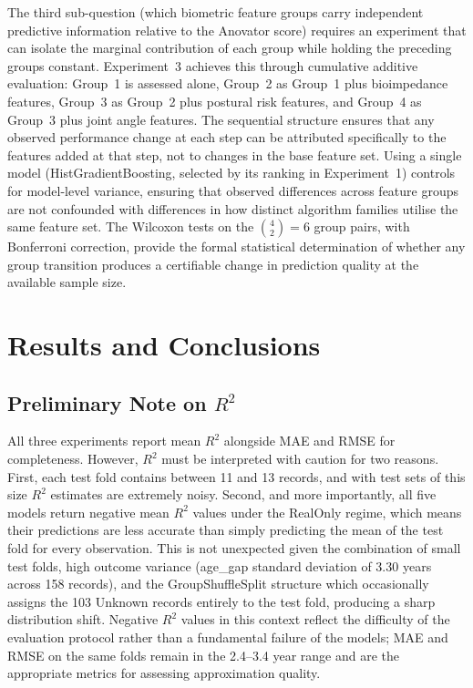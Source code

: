 \documentclass[11pt,a4paper]{report}
\begin{document}
The third sub-question (which biometric feature groups carry independent predictive information
relative to the Anovator score) requires an experiment that can isolate the marginal
contribution of each group while holding the preceding groups constant. Experiment~3 achieves this
through cumulative additive evaluation: Group~1 is assessed alone, Group~2 as Group~1 plus
bioimpedance features, Group~3 as Group~2 plus postural risk features, and Group~4 as Group~3
plus joint angle features. The sequential structure ensures that any observed performance change
at each step can be attributed specifically to the features added at that step, not to changes in
the base feature set. Using a single model (HistGradientBoosting, selected by its ranking in
Experiment~1) controls for model-level variance, ensuring that observed differences across
feature groups are not confounded with differences in how distinct algorithm families utilise the
same feature set. The Wilcoxon tests on the $\binom{4}{2} = 6$ group pairs, with Bonferroni correction,
provide the formal statistical determination of whether any group transition produces a certifiable
change in prediction quality at the available sample size.


\chapter{Results and Conclusions}

\section{Preliminary Note on \texorpdfstring{$R^2$}{R-squared}}

All three experiments report mean $R^2$ alongside MAE and RMSE for completeness. However, $R^2$ must be interpreted with caution for two reasons. First, each test fold contains between 11 and 13 records, and with test sets of this size $R^2$ estimates are extremely noisy. Second, and more importantly, all five models return negative mean $R^2$ values under the RealOnly regime, which means their predictions are less accurate than simply predicting the mean of the test fold for every observation. This is not unexpected given the combination of small test folds, high outcome variance (age\_gap standard deviation of 3.30 years across 158 records), and the GroupShuffleSplit structure which occasionally assigns the 103 Unknown records entirely to the test fold, producing a sharp distribution shift. Negative $R^2$ values in this context reflect the difficulty of the evaluation protocol rather than a fundamental failure of the models; MAE and RMSE on the same folds remain in the 2.4--3.4 year range and are the appropriate metrics for assessing approximation quality.
\end{document}
